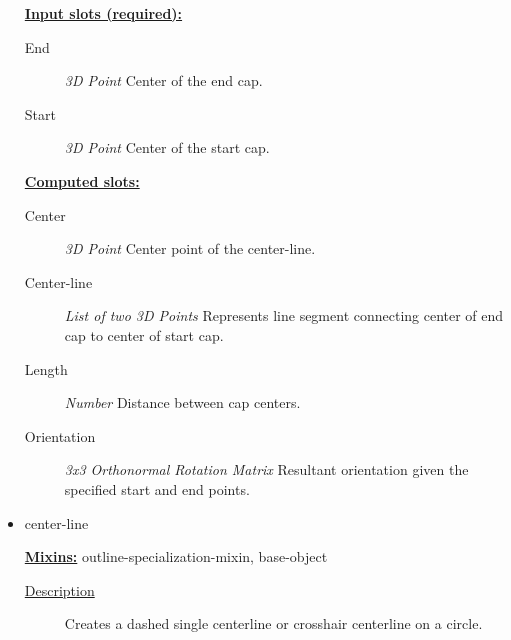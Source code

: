 \documentclass [11pt]{book}
\begin{document}
\begin{itemize}
\textbf{
\underline{Input slots (required):}}

\begin{description}

\item [End]
\emph{3D Point} Center of the end cap.


\item [Start]
\emph{3D Point} Center of the start cap.


\end{description}






\textbf{
\underline{Computed slots:}}

\begin{description}

\item [Center]
\emph{3D Point} Center point of the center-line.


\item [Center-line]
\emph{List of two 3D Points} Represents line segment connecting center of end cap to center of start cap.


\item [Length]
\emph{Number} Distance between cap centers.


\item [Orientation]
\emph{3x3 Orthonormal Rotation Matrix} Resultant orientation given the specified start and end points.


\end{description}







\item {}center-line


\textbf{
\underline{Mixins:}} outline-specialization-mixin, base-object





\begin{description}

\item [
\underline{Description}]


Creates a dashed single centerline or crosshair centerline on a circle.




\end{description}
\end{itemize}
\end{document}
